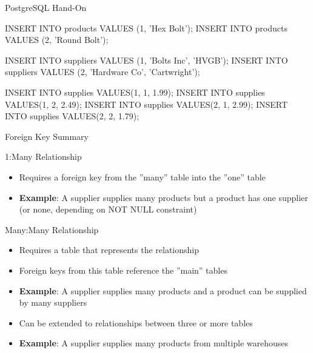 \documentclass[ignorenonframetext,xcolor=x11names]{beamer}
\begin{document}
\begin{frame}[fragile]{PostgreSQL Hand-On}
\footnotesize
\begin{sqlcode}
INSERT INTO products VALUES (1, 'Hex Bolt');
INSERT INTO products VALUES (2, 'Round Bolt');

INSERT INTO suppliers VALUES (1, 'Bolts Inc', 'HVGB');
INSERT INTO suppliers 
    VALUES (2, 'Hardware Co', 'Cartwright');

INSERT INTO supplies VALUES(1, 1, 1.99);
INSERT INTO supplies VALUES(1, 2, 2.49);
INSERT INTO supplies VALUES(2, 1, 2.99);
INSERT INTO supplies VALUES(2, 2, 1.79);
\end{sqlcode}
\end{frame}

\begin{frame}{Foreign Key Summary}
\small
\begin{block}{1:Many Relationship}
\begin{itemize}
  \item Requires a foreign key from the ''many'' table into the ''one'' table
  \item \textbf{Example}: A supplier supplies many products but a product has one supplier (or none, depending on NOT NULL constraint)
\end{itemize}
\end{block}
\begin{block}{Many:Many Relationship}
\begin{itemize}
  \item Requires a table that represents the relationship
  \item Foreign keys from this table reference the ''main'' tables
  \item \textbf{Example}: A supplier supplies many products and a product can be supplied by many suppliers
  \item Can be extended to relationships between three or more tables
  \item \textbf{Example}: A supplier supplies many products from multiple warehouses
\end{itemize}
\end{block}
\end{frame}
\end{document}
